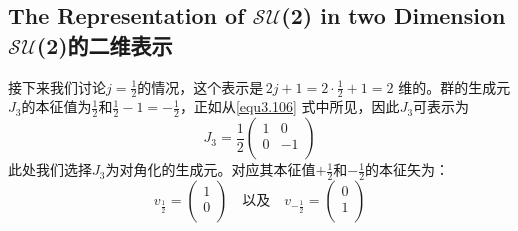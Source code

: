 \subsection[$\mathcal{SU}$(2)的二维表示]{The Representation of $\mathcal{SU}$(2) in two Dimension $\mathcal{SU}$(2)的二维表示}
\label{sec3.6.4}
接下来我们讨论$j=\frac{1}{2}$的情况，这个表示是$\,2j+1=2 \cdot \frac{1}{2}+1=2$ 维的。群的生成元$J_3$的本征值为$\frac{1}{2}$和$\frac{1}{2}-1=-\frac{1}{2}$，正如从\ref{equ3.106} 式中所见，因此$J_3$可表示为
\begin{equation}\label{3.113}
  J_3=\frac{1}{2}\left(
                   \begin{array}{cc}
                     1 & 0 \\
                     0 & -1 \\
                   \end{array}
                 \right)
\end{equation}
此处我们选择$J_3$为对角化的生成元。对应其本征值$+\frac{1}{2}$和$-\frac{1}{2}$的本征矢为：
\begin{equation}\label{equ3.114}
  v_\frac{1}{2}=\left(
                  \begin{array}{c}
                    1 \\
                    0 \\
                  \end{array}
                \right)
                \quad \text{以及} \quad
     v_{-\frac{1}{2}}=\left(
                  \begin{array}{c}
                    0\\
                    1\\
                  \end{array}
                \right)
\end{equation}

